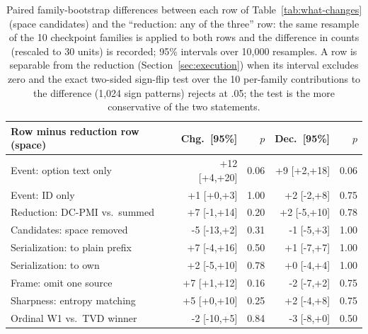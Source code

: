 \begin{table}[t]
\centering\scriptsize
\setlength{\tabcolsep}{2pt}
\begin{tabular}{@{}lrrrr@{}}
\toprule
Row minus reduction row (space) & Chg.\ [95\%] & $p$ & Dec.\ [95\%] & $p$ \\
\midrule
Event: option text only & +12 [+4,+20] & 0.06 & +9 [+2,+18] & 0.06 \\
Event: ID only & +1 [+0,+3] & 1.00 & +2 [-2,+8] & 0.75 \\
Reduction: DC-PMI vs.\ summed & +7 [-1,+14] & 0.20 & +2 [-5,+10] & 0.78 \\
Candidates: space removed & -5 [-13,+2] & 0.31 & -1 [-5,+3] & 1.00 \\
Serialization: to plain prefix & +7 [-4,+16] & 0.50 & +1 [-7,+7] & 1.00 \\
Serialization: to own & +2 [-5,+10] & 0.78 & +0 [-4,+4] & 1.00 \\
Frame: omit one source & +7 [+1,+12] & 0.16 & -2 [-7,+2] & 0.75 \\
Sharpness: entropy matching & +5 [+0,+10] & 0.25 & +2 [-4,+8] & 0.75 \\
Ordinal W1 vs.\ TVD winner & -2 [-10,+5] & 0.84 & -3 [-8,+0] & 0.50 \\
\bottomrule
\end{tabular}
\caption{Paired family-bootstrap differences between each row of Table~\ref{tab:what-changes} (space candidates) and the ``reduction: any of the three'' row: the same resample of the 10 checkpoint families is applied to both rows and the difference in counts (rescaled to 30 units) is recorded; 95\% intervals over 10,000 resamples. A row is separable from the reduction (Section~\ref{sec:execution}) when its interval excludes zero and the exact two-sided sign-flip test over the 10 per-family contributions to the difference (1,024 sign patterns) rejects at .05; the test is the more conservative of the two statements.}
\label{tab:family-boot-diff}
\end{table}

